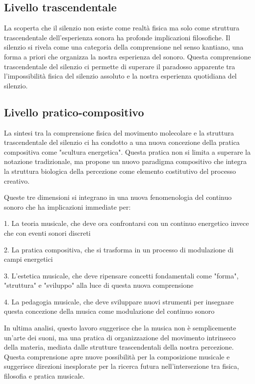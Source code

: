 \documentclass[a4paper,11pt]{article}
\begin{document}
\subsection{Livello trascendentale}\hypertarget{livello-trascendentale}{}\label{livello-trascendentale}

La scoperta che il silenzio non esiste come realtà fisica ma solo come
struttura trascendentale dell'esperienza sonora ha profonde implicazioni
filosofiche. Il silenzio si rivela come una categoria della comprensione
nel senso kantiano, una forma a priori che organizza la nostra
esperienza del sonoro. Questa comprensione trascendentale del silenzio
ci permette di superare il paradosso apparente tra l'impossibilità
fisica del silenzio assoluto e la nostra esperienza quotidiana del
silenzio.

\subsection{Livello pratico-compositivo}\hypertarget{livello-pratico-compositivo}{}\label{livello-pratico-compositivo}

La sintesi tra la comprensione fisica del movimento molecolare e la
struttura trascendentale del silenzio ci ha condotto a una nuova
concezione della pratica compositiva come "scultura energetica".
Questa pratica non si limita a superare la notazione tradizionale, ma
propone un nuovo paradigma compositivo che integra la struttura
biologica della percezione come elemento costitutivo del processo
creativo.

Queste tre dimensioni si integrano in una nuova fenomenologia del
continuo sonoro che ha implicazioni immediate per:

1. La teoria musicale, che deve ora confrontarsi con un continuo
energetico invece che con eventi sonori discreti

2. La pratica compositiva, che si trasforma in un processo di
modulazione di campi energetici

3. L'estetica musicale, che deve ripensare concetti fondamentali come
"forma", "struttura" e "sviluppo" alla luce di questa nuova
comprensione

4. La pedagogia musicale, che deve sviluppare nuovi strumenti per
insegnare questa concezione della musica come modulazione del continuo
sonoro

In ultima analisi, questo lavoro suggerisce che la musica non è
semplicemente un'arte dei suoni, ma una pratica di organizzazione del
movimento intrinseco della materia, mediata dalle strutture
trascendentali della nostra percezione. Questa comprensione apre nuove
possibilità per la composizione musicale e suggerisce direzioni
inesplorate per la ricerca futura nell'intersezione tra fisica,
filosofia e pratica musicale.
\end{document}

